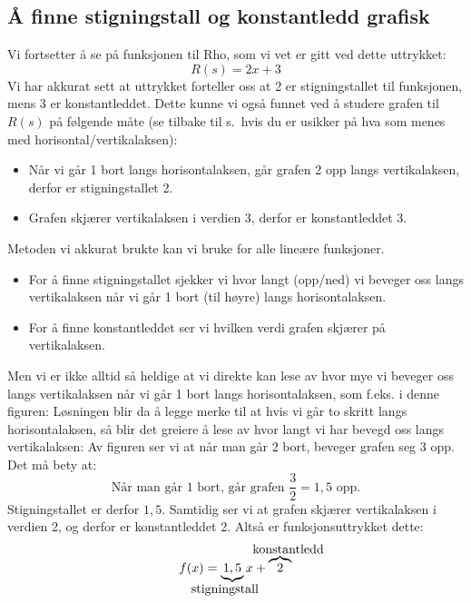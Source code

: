 \subsection{Å finne stigningstall og konstantledd grafisk}
Vi fortsetter å se på funksjonen til Rho, som vi vet er gitt ved dette uttrykket:
\[ R(s)=2x+3 \]
Vi har akkurat sett at uttrykket forteller oss at 2 er stigningstallet til funksjonen, mens 3 er konstantleddet. Dette kunne vi også funnet ved å studere grafen til $ R(s) $ på følgende måte (se tilbake til s.\,\pageref{axes} hvis du er usikker på hva som menes med horisontal/vertikalaksen):
\begin{itemize}
	\item Når vi går 1 bort langs horisontalaksen, går grafen 2 opp langs vertikalaksen, derfor er stigningstallet 2.
	\item Grafen skjærer vertikalaksen i verdien 3, derfor er konstantleddet 3.
\end{itemize}
Metoden vi akkurat brukte kan vi bruke for alle lineære funksjoner. 
\begin{itemize}
	\item For å finne stigningstallet sjekker vi hvor langt (opp/ned) vi beveger oss langs vertikalaksen når vi går 1 bort (til høyre) langs horisontalaksen.
	\item For å finne konstantleddet ser vi hvilken verdi grafen skjærer på vertikalaksen.
\end{itemize}
Men vi er ikke alltid så heldige at vi direkte kan lese av hvor mye vi beveger oss langs vertikalaksen når vi går 1 bort langs horisontalaksen, som f.eks. i denne figuren:
Løsningen blir da å legge merke til at hvis vi går to skritt langs horisontalaksen, så blir det greiere å lese av hvor langt vi har bevegd oss langs vertikalaksen:
Av figuren ser vi at når man går 2 bort, beveger grafen seg 3 opp. Det må bety at:\vs
\[ \text{Når man går 1 bort, går grafen }\frac{3}{2}=1,5\text{ opp.} \]
Stigningstallet er derfor $ 1,5 $. Samtidig ser vi at grafen skjærer vertikalaksen i verdien 2, og derfor er konstantleddet 2. Altså er funksjonsuttrykket dette: \vs
\[  f(x)=\underbrace{1,5}_{\llap{stigningstall}}x +\overbrace{2}^{\rlap{konstantledd}}\]
